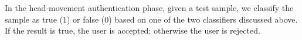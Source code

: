 In the head-movement authentication phase, given a test sample, we classify the sample as true (1) or false
(0) based on one of the two classifiers discussed above. If the result is true, the user is accepted; otherwise
the user is rejected.
\fi




